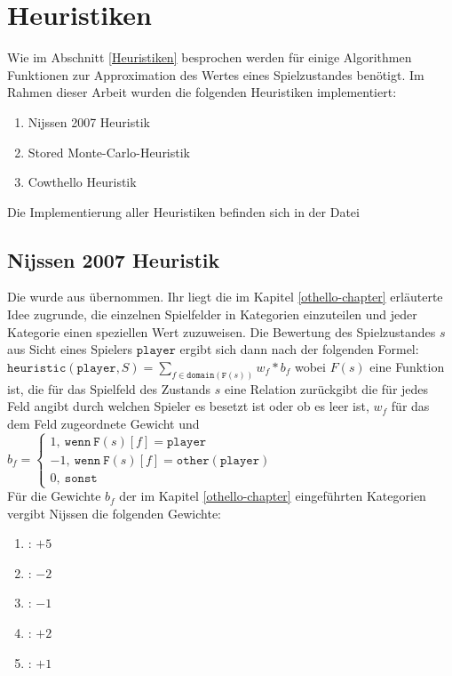 \section{Heuristiken}
\label{heuristic}
Wie im Abschnitt \ref{Heuristiken} besprochen werden für einige Algorithmen Funktionen zur Approximation des Wertes eines Spielzustandes benötigt. Im Rahmen dieser Arbeit wurden die folgenden Heuristiken implementiert:
\begin{enumerate}
\item Nijssen 2007 Heuristik
\item Stored Monte-Carlo-Heuristik
\item Cowthello Heuristik
\end{enumerate}
Die Implementierung aller Heuristiken befinden sich in der Datei 
\subsection{Nijssen 2007 Heuristik}
Die  wurde aus \cite{nijssen_2007} übernommen. Ihr liegt die im Kapitel \ref{othello-chapter} erläuterte Idee zugrunde, die einzelnen Spielfelder in Kategorien einzuteilen und jeder Kategorie einen speziellen Wert zuzuweisen. Die Bewertung des Spielzustandes $s$ aus Sicht eines Spielers $\mathtt{player}$ ergibt sich dann nach der folgenden Formel: $\mathtt{heuristic}(\mathtt{player}, S) = \sum\limits_{f \in \mathtt{domain}(\mathtt{F}(s))}  w_{f} * b_{f}$ wobei $F(s)$ eine Funktion ist, die für das Spielfeld des Zustands $s$ eine Relation zurückgibt die für jedes Feld angibt durch welchen Spieler es besetzt ist oder ob es leer ist, $w_{f}$ für das dem Feld zugeordnete Gewicht und $b_{f} = \begin{cases} 1 \mathtt{,\ wenn\ F}(s)[f] = \mathtt{player} \\ -1 \mathtt{,\ wenn\ F}(s)[f] = \mathtt{other(player)} \\ 0 \mathtt{,\ sonst} \end{cases}$
\\Für die Gewichte $b_{f}$ der im Kapitel \ref{othello-chapter} eingeführten Kategorien vergibt Nijssen die folgenden Gewichte:
\begin{enumerate}
\item {}: $+5$
\item {}: $-2$
\item {}: $-1$
\item {}: $+2$
\item {}: $+1$
\end{enumerate}
